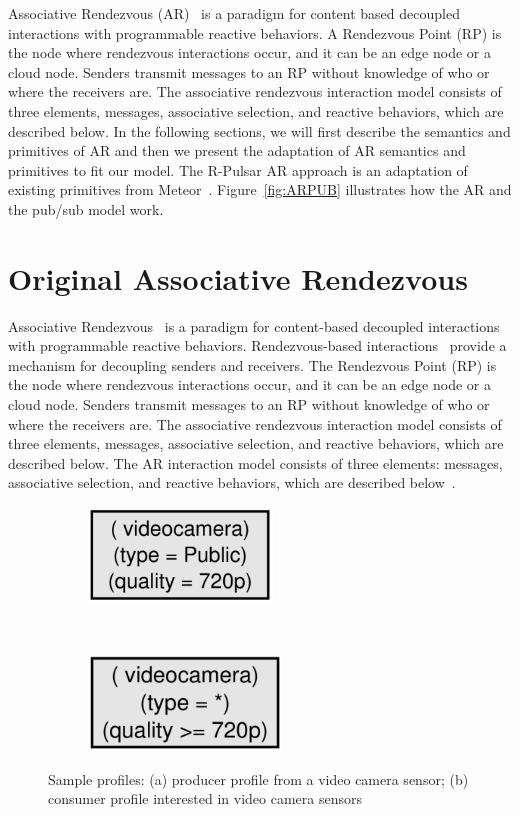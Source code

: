 Associative Rendezvous (AR)~\cite{AR} is a paradigm for content based decoupled interactions with programmable reactive behaviors. A Rendezvous Point (RP) is the node where rendezvous interactions occur, and it can be an edge node or a cloud node. Senders transmit messages to an RP without knowledge of who or where the receivers are. The associative rendezvous interaction model consists of three elements, messages, associative selection, and reactive behaviors, which are described below. In the following sections, we will first describe the semantics and primitives of AR and then we present the adaptation of AR semantics and primitives to fit our model. The R-Pulsar AR approach is an adaptation of existing primitives from Meteor~\cite{meteor2008}. Figure~\ref{fig:ARPUB} illustrates how the AR and the pub/sub model work.

\section{Original Associative Rendezvous} 
Associative Rendezvous~\cite{meteor2008} is a paradigm for content-based decoupled interactions with programmable reactive behaviors. Rendezvous-based interactions~\cite{AR} provide a mechanism for decoupling senders and receivers. The Rendezvous Point (RP) is the node where rendezvous interactions occur, and it can be an edge node or a cloud node. Senders transmit messages to an RP without knowledge of who or where the receivers are. The associative rendezvous interaction model consists of three elements, messages, associative selection, and reactive behaviors, which are described below. The AR interaction model consists of three elements: messages, associative selection, and reactive behaviors, which are described below~\cite{meteor2008}.

\begin{figure}
    \centering
    \begin{subfigure}[t]{0.5\textwidth}
        \centering
        \includegraphics[height=1in]{Figures/data_profile.pdf}
        \caption{}
        \label{fig:data_profile}
    \end{subfigure}%
    ~ 
    \begin{subfigure}[t]{0.5\textwidth}
        \centering
        \includegraphics[height=1in]{Figures/interest_profile.pdf}
        \caption{}
        \label{fig:interest_profile}
    \end{subfigure}
    \caption{Sample profiles: (a) producer profile from a video camera sensor; (b) consumer profile interested in video camera sensors}\label{fig:samples_profiles}
\end{figure}




